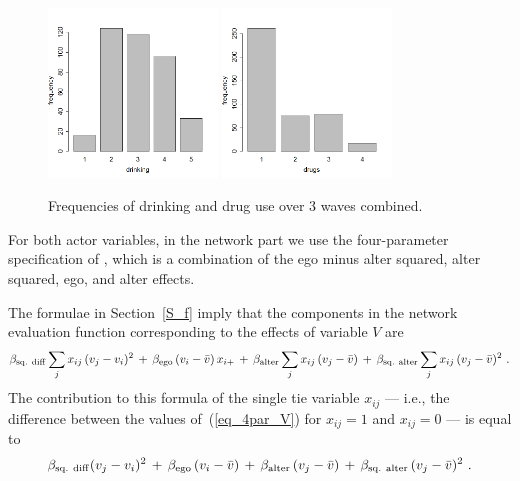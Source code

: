 \documentclass[a4paper,fleqn,11pt]{article}
\newcommand{\+}{\, + \,}
\begin{document}
\begin{figure}
  \centering
  \includegraphics[width=0.4\textwidth]{TableDrinking.png}
  \hspace{1em}
  \includegraphics[width=0.4\textwidth]{TableDrugs.png}
  \caption{Frequencies of drinking and drug use over 3 waves combined.}\label{F_DD}
\end{figure}

For both actor variables, in the network part we use the
four-parameter specification of \citet{SL2019}, which is
a combination of the ego minus alter squared, alter squared,
ego, and alter effects.

The formulae in Section~\ref{S_f} imply that the
components in the network evaluation function corresponding to the effects
of variable $V$ are
\begin{equation}
\beta_{\rm sq.\ diff}  \sum_j x_{ij}\, (v_j - v_i)^2  \, + \,
 \beta_{\rm ego}\, (v_i - \bar v) \, x_{i+}
           \, + \, \beta_{\rm alter}  \sum_j x_{ij}\, (v_j - \bar v)
 \, + \, \beta_{\rm sq.\ alter}  \sum_j x_{ij}\, (v_j - \bar v)^2  \ .
          \label{eq_4par_V}
\end{equation}
The contribution to this formula of the single tie variable $x_{ij}$  ---
i.e., the difference between the values of~(\ref{eq_4par_V}) for $x_{ij}=1$
and $x_{ij}=0$  ---  is equal to
\begin{equation}
\beta_{\rm sq.\ diff}   (v_j - v_i)^2 \, + \,
  \beta_{\rm ego}\, (v_i - \bar v)
         \, + \, \beta_{\rm alter}\,  (v_j - \bar v) \, + \,
      \beta_{\rm sq.\ alter}  \, (v_j - \bar v)^2   \ .
                 \label{eq_4par}
\end{equation}
\end{document}
